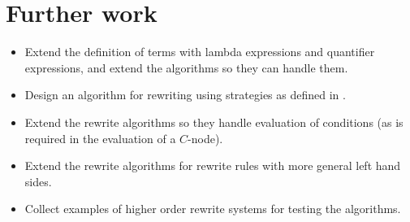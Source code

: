 \documentclass{article}
\begin{document}
\section{Further work}

\begin{itemize}
\item Extend the definition of terms with lambda expressions and quantifier
expressions, and extend the algorithms so they can handle them.

\item Design an algorithm for rewriting using strategies as defined in \cite%
{weerdenburg2009}.

\item Extend the rewrite algorithms so they handle evaluation of conditions
(as is required in the evaluation of a $C$-node).

\item Extend the rewrite algorithms for rewrite rules with more general left
hand sides.

\item Collect examples of higher order rewrite systems for testing the
algorithms.
\end{itemize}



\end{document}
